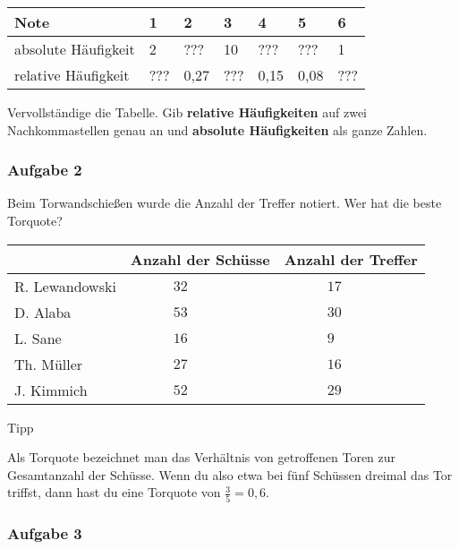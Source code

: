 \documentclass[
  ngerman,
]{book}
\begin{document}
\begin{longtable}[]{@{}lllllll@{}}
\toprule
Note & 1 & 2 & 3 & 4 & 5 & 6\tabularnewline
\midrule
\endhead
absolute Häufigkeit & 2 & ??? & 10 & ??? & ??? & 1\tabularnewline
relative Häufigkeit & ??? & 0,27 & ??? & 0,15 & 0,08 & ???\tabularnewline
\bottomrule
\end{longtable}

Vervollständige die Tabelle. Gib \textbf{relative Häufigkeiten} auf zwei Nachkommastellen genau an und \textbf{absolute Häufigkeiten} als ganze Zahlen.

\hypertarget{section-8}{%
\subsubsection*{}\label{section-8}}

\hypertarget{aufgabe-2-1}{%
\subsubsection*{Aufgabe 2}\label{aufgabe-2-1}}

Beim Torwandschießen wurde die Anzahl der Treffer notiert. Wer hat die beste Torquote?

\begin{longtable}[]{@{}lll@{}}
\toprule
& Anzahl der Schüsse & Anzahl der Treffer\tabularnewline
\midrule
\endhead
R. Lewandowski & \(\quad\quad\quad 32\) & \(\quad\quad\quad 17\)\tabularnewline
D. Alaba & \(\quad\quad\quad 53\) & \(\quad\quad\quad 30\)\tabularnewline
L. Sane & \(\quad\quad\quad 16\) & \(\quad\quad\quad 9\)\tabularnewline
Th. Müller & \(\quad\quad\quad 27\) & \(\quad\quad\quad 16\)\tabularnewline
J. Kimmich & \(\quad\quad\quad 52\) & \(\quad\quad\quad 29\)\tabularnewline
\bottomrule
\end{longtable}

Tipp

Als Torquote bezeichnet man das Verhältnis von getroffenen Toren zur Gesamtanzahl der Schüsse. Wenn du also etwa bei fünf Schüssen dreimal das Tor triffst, dann hast du eine Torquote von \(\frac{3}{5}=0,6\).

\hypertarget{section-9}{%
\subsubsection*{}\label{section-9}}

\hypertarget{aufgabe-3}{%
\subsubsection*{Aufgabe 3}\label{aufgabe-3}}
\end{document}
